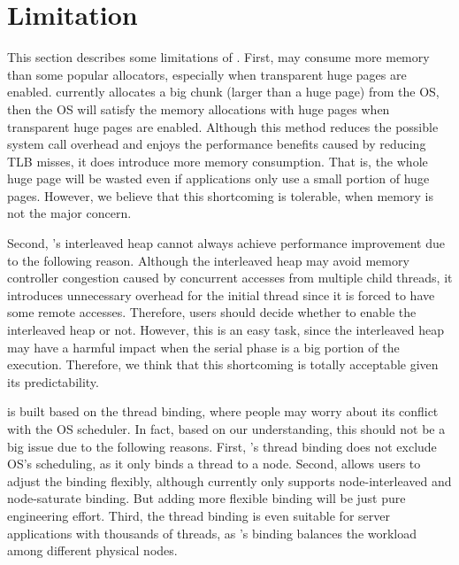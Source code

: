 \section{Limitation}
\label{sec:limit}

This section describes some limitations of \NM{}. First, \NM{} may consume more memory than some popular allocators, especially when transparent huge pages are enabled. \NM{} currently allocates a big chunk (larger than a huge page) from the OS, then the OS will satisfy the memory allocations with huge pages when transparent huge pages are enabled. Although this method reduces the possible system call overhead and enjoys the performance benefits caused by reducing TLB misses, it does introduce more memory consumption. That is, the whole huge page will be wasted even if applications only use a small portion of huge pages. However, we believe that this shortcoming is tolerable, when memory is not the major concern. 


Second, \NM{}'s interleaved heap cannot always achieve performance improvement due to the following reason. Although the interleaved heap may avoid memory controller congestion caused by concurrent accesses from multiple child threads, it introduces unnecessary overhead for the initial thread since it is forced to have some remote accesses. 
Therefore, users should decide whether to enable the interleaved heap or not. However, this is an easy task, since the interleaved heap may have a harmful impact when the serial phase is a big portion of the execution. Therefore, we think that this shortcoming is totally acceptable given its predictability. 

\NM{} is built based on the thread binding, where people may worry about its conflict with the OS scheduler. In fact, based on our understanding, this should not be a big issue due to the following reasons. First, \NM{}'s thread binding does not exclude OS's scheduling, as it only binds a thread to a node. Second, \NM{} allows users to adjust the binding flexibly, although currently \NM{} only supports node-interleaved and node-saturate binding. But adding more flexible binding will be just pure engineering effort. Third, the thread binding is even suitable for server applications with thousands of threads, as \NM{}'s binding balances the workload among different physical nodes. 

